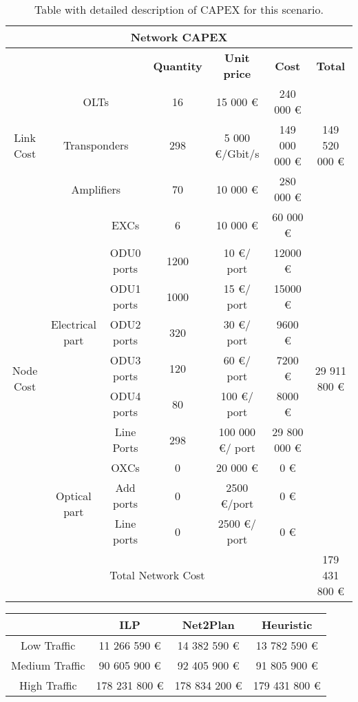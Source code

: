 \begin{table}[H]
	\centering
	\begin{tabular}{| c | c | c | c | c | c | c |}
		\hline
		\multicolumn{7}{|c|}{\textbf{Network CAPEX}} \\ \hline
		\multicolumn{3}{|c|}{} & \textbf{Quantity} & \textbf{Unit price} & \textbf{Cost} & \textbf{Total} \\ \hline
		\multirow{3}{*}{Link Cost} & \multicolumn{2}{c|}{OLTs} & 16 & 15 000 \euro & 240 000 \euro & \multirow{3}{*}{149 520 000 \euro} \\ \cline{2-6}
		& \multicolumn{2}{c|}{Transponders} & 298 & 5 000 \euro /Gbit/s & 149 000 000 \euro &  \\ \cline{2-6}
		& \multicolumn{2}{c|}{Amplifiers} & 70 & 10 000 \euro & 280 000 \euro &  \\ \hline
		\multirow{10}{*}{Node Cost} & \multirow{7}{*}{Electrical part} & EXCs & 6 & 10 000 \euro & 60 000 \euro & \multirow{10}{*}{29 911 800 \euro} \\ \cline{3-6}
		&  & ODU0 ports & 1200 & 10 \euro/ port & 12000 \euro &  \\ \cline{3-6}
		&  & ODU1 ports & 1000 & 15 \euro/ port & 15000 \euro &  \\ \cline{3-6}
		&  & ODU2 ports & 320 & 30 \euro/ port & 9600 \euro &  \\ \cline{3-6}
		&  & ODU3 ports & 120 & 60 \euro/ port & 7200 \euro &  \\ \cline{3-6}
		&  & ODU4 ports & 80 & 100 \euro/ port & 8000 \euro &  \\ \cline{3-6}
		&  & Line Ports & 298 & 100 000 \euro/ port & 29 800 000 \euro &  \\ \cline{2-6}
		& \multirow{3}{*}{Optical part} & OXCs & 0 & 20 000 \euro & 0 \euro &  \\ \cline{3-6}
		&  & Add ports & 0 & 2500 \euro/port & 0 \euro &  \\ \cline{3-6}
		&  & Line ports & 0 & 2500 \euro/ port & 0 \euro &  \\ \hline
		\multicolumn{6}{|c|}{Total Network Cost} & 179 431 800 \euro \\ \hline
	\end{tabular}
	\caption{Table with detailed description of CAPEX for this scenario.}
	\label{capex}
\end{table}

\begin{table}[H]
	\centering
	\begin{tabular}{| c | c | c | c |}
		\hline
		               & ILP         & Net2Plan    & Heuristic     \\ \hline
		Low Traffic    & 11 266 590 \euro  & 14 382 590 \euro  & 13 782 590 \euro   \\ \hline
		Medium Traffic & 90 605 900 \euro  & 92 405 900 \euro  & 91 805 900 \euro   \\ \hline
		High Traffic   & 178 231 800 \euro & 178 834 200 \euro & 179 431 800 \euro  \\ \hline
	\end{tabular}
\end{table}
